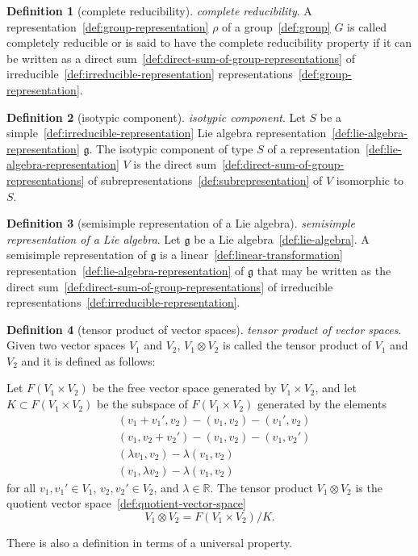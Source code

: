 \documentclass[12pt,a4paper]{article}
\theoremstyle{definition}
\newtheorem{definition}{Definition}
\begin{document}
\begin{definition}[complete reducibility]\label{def:complete-reducibility}
\emph{complete reducibility}. A representation~\ref{def:group-representation} $\rho$ of a group~\ref{def:group} $G$ is called completely reducible or is said to have the complete reducibility property if it can be written as a direct sum~\ref{def:direct-sum-of-group-representations} of irreducible~\ref{def:irreducible-representation} representations~\ref{def:group-representation}.
\end{definition}

\begin{definition}[isotypic component]\label{def:isotypic-component}
\emph{isotypic component}. Let $S$ be a simple~\ref{def:irreducible-representation} Lie algebra representation~\ref{def:lie-algebra-representation} $\mathfrak g$. The isotypic component of type $S$ of a representation~\ref{def:lie-algebra-representation} $V$ is the direct sum~\ref{def:direct-sum-of-group-representations} of subrepresentations~\ref{def:subrepresentation} of $V$ isomorphic to $S$.
\end{definition}

\begin{definition}[semisimple representation of a Lie algebra]\label{def:semisimple-representation-of-a-lie-algebra}
\emph{semisimple representation of a Lie algebra}. Let $\mathfrak g$ be a Lie algebra~\ref{def:lie-algebra}. A semisimple representation of $\mathfrak g$ is a linear~\ref{def:linear-transformation} representation~\ref{def:lie-algebra-representation} of $\mathfrak g$ that may be written as the direct sum~\ref{def:direct-sum-of-group-representations} of irreducible representations~\ref{def:irreducible-representation}.
\end{definition}

\begin{definition}[tensor product of vector spaces]\label{def:tensor-product-of-vector-spaces}
\emph{tensor product of vector spaces}. Given two vector spaces $V_1$ and $V_2$, $V_1 \otimes V_2$ is called the tensor product of $V_1$ and $V_2$ and it is defined as follows: 

Let $F(V_1 \times V_2)$ be the free vector space generated by $V_1 \times V_2$, and let $K \subset F(V_1 \times V_2)$ be the subspace of $F(V_1 \times V_2)$ generated by the elements 
$$\begin{align*} &(v_1 + v_1', v_2) - (v_1,v_2) - (v_1', v_2)\\ &(v_1, v_2+v_2') - (v_1,v_2)- (v_1, v_2') \\ &(\lambda v_1, v_2) - \lambda (v_1, v_2) \\ &(v_1, \lambda v_2) - \lambda(v_1,v_2)\end{align*}$$ for all $v_1,v_1'\in V_1$, $v_2, v_2' \in V_2$, and $\lambda \in \mathbb R$. The tensor product $V_1 \otimes V_2$ is the quotient vector space~\ref{def:quotient-vector-space} $$V_1 \otimes V_2 = F(V_1 \times V_2)/K.$$

There is also a definition in terms of a universal property.
\end{definition}
\end{document}
